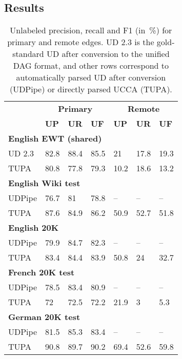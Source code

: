 \documentclass[11pt,a4paper]{article}
\begin{document}
\subsection{Results}\label{sec:results}


\begin{table}[t]
\centering
\begin{tabular}{l|lll|lll}
& \multicolumn{3}{c|}{\footnotesize \bf Primary} & \multicolumn{3}{c}{\footnotesize \bf Remote} \\
& \footnotesize \textbf{UP} & \footnotesize \textbf{UR} & \footnotesize \textbf{UF}
& \footnotesize \textbf{UP} & \footnotesize \textbf{UR} & \footnotesize \textbf{UF} \\
\hline
\multicolumn{4}{l|}{\small \bf English EWT (shared)} & \\
\footnotesize UD 2.3
& 82.8 & 88.4 & 85.5 & 21 & 17.8 & 19.3 \\
\footnotesize TUPA
& 80.8 & 77.8 & 79.3 & 10.2 & 18.6 & 13.2 \\
\multicolumn{4}{l|}{\small \bf English Wiki test} & \\
\footnotesize UDPipe
& 76.7 & 81 & 78.8 & -- & -- & -- \\
\footnotesize TUPA
& 87.6 & 84.9 & 86.2 & 50.9 & 52.7 & 51.8 \\
\multicolumn{4}{l|}{\small \bf English 20K} & \\
\footnotesize UDPipe
& 79.9 & 84.7 & 82.3 & -- & -- & -- \\
\footnotesize TUPA
& 83.4 & 84.4 & 83.9 & 50.8 & 24 & 32.7 \\
\multicolumn{4}{l|}{\small \bf French 20K test} & \\
\footnotesize UDPipe
& 78.5 & 83.4 & 80.9 & -- & -- & -- \\
\footnotesize TUPA
& 72 & 72.5 & 72.2 & 21.9 & 3 & 5.3 \\
\multicolumn{4}{l|}{\small \bf German 20K test} & \\
\footnotesize UDPipe
& 81.5 & 85.3 & 83.4 & -- & -- & -- \\
\footnotesize TUPA
& 90.8 & 89.7 & 90.2 & 69.4 & 52.6 & 59.8
\end{tabular}
\caption{
Unlabeled precision, recall and F1 (in~\%) for primary and remote edges.
UD 2.3 is the gold-standard UD after conversion to the unified DAG format,
and other rows correspond to automatically parsed UD after conversion (UDPipe)
or directly parsed UCCA (TUPA).
\label{tab:conversion_results_unlabeled}}
\end{table}
\end{document}
